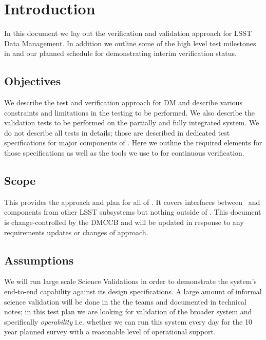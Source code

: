 
\section{Introduction \label{sect:intro}}
In this document  we lay out  the verification and validation approach for LSST Data Management. In addition we outline some of the high level test milestones in  and our planned schedule for demonstrating interim verification status.

\subsection{Objectives \label{sect:objectives}}

We describe the test and verification approach for DM and describe various constraints and limitations in the testing to be performed. 
We also describe the validation tests to be performed on the partially and fully integrated system. 
We do not describe all tests in details; those are described in dedicated test specifications for major components of \product. Here we outline the required elements for those specifications as well as the tools we use to for continuous verification. 

\subsection{Scope \label{sect:scope}}

This provides the approach and plan for all of \product. It covers interfaces between \product\ and components from other LSST subsystems but nothing outside of \product. 
This document is change-controlled by the DMCCB and will be updated in response to any requirements updates or changes of approach.

\subsection{Assumptions}  
 We will run large scale Science Validations in order to demonstrate the system's end-to-end capability against its design specifications. A large amount of informal science validation will be done in the the teams and documented in technical notes; in this test plan we are looking for validation of the broader system and specifically {\em operability} i.e. whether we can run this system every day for the 10 year planned survey with a reasonable level of operational support.

